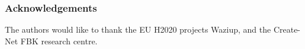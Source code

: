 \documentclass{beamer}
\begin{document}
\begin{frame}
\frametitle{Acknowledgements}

The authors would like to thank the EU H2020 projects Waziup, and the Create-Net FBK research centre. \\

\end{frame}
\end{document}
